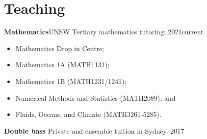 
\section{Teaching}



\textbf{Mathematics}\hfill UNSW
\newline
Tertiary mathematics tutoring: \hfill 2021\textendash current
\begin{itemize}
    \item Mathematics Drop in Centre;
    \item Mathematics 1A (MATH1131);
    \item Mathematics 1B (MATH1231/1241);
    \item Numerical Methods and Statistics (MATH2089); and
    \item Fluids, Oceans, and Climate (MATH3261-5285).
\end{itemize}

\textbf{Double bass}
\newline
Private and ensemble tuition in Sydney. \hfill 2017
